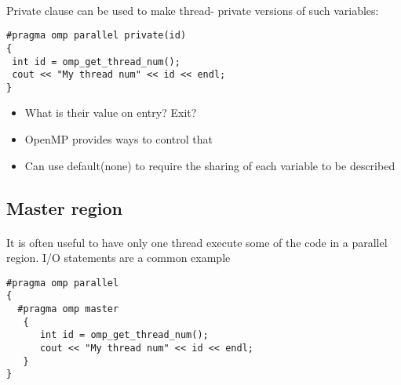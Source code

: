 \documentclass[%
oneside,                 %
final,                   %
10pt]{article}
\begin{document}
\paragraph{}
Private clause can be used to make thread- private versions of such variables: 






\begin{verbatim}
#pragma omp parallel private(id)
{
 int id = omp_get_thread_num();
 cout << "My thread num" << id << endl; 
}

\end{verbatim}

\begin{itemize}
\item What is their value on entry? Exit?

\item OpenMP provides ways to control that

\item Can use default(none) to require the sharing of each variable to be described
\end{itemize}

\noindent



\subsection*{Master region}

\paragraph{}
It is often useful to have only one thread execute some of the code in a parallel region. I/O statements are a common example









\begin{verbatim}
#pragma omp parallel 
{
  #pragma omp master
   {
      int id = omp_get_thread_num();
      cout << "My thread num" << id << endl; 
   } 
}

\end{verbatim}
\end{document}
